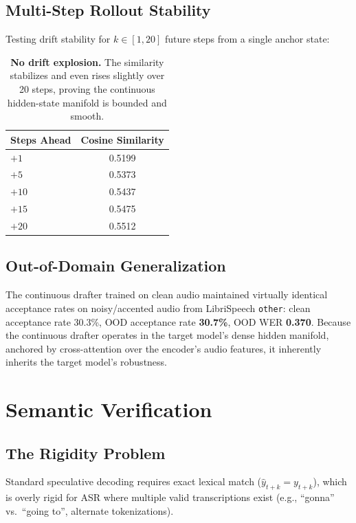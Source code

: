 \documentclass[11pt,a4paper]{article}
\begin{document}
\subsection{Multi-Step Rollout Stability}

Testing drift stability for $k \in [1, 20]$ future steps from a single anchor state:

\begin{table}[H]
\centering
\small
\begin{tabular}{@{}lc@{}}
\toprule
\textbf{Steps Ahead} & \textbf{Cosine Similarity} \\
\midrule
$+1$  & 0.5199 \\
$+5$  & 0.5373 \\
$+10$ & 0.5437 \\
$+15$ & 0.5475 \\
$+20$ & 0.5512 \\
\bottomrule
\end{tabular}
\caption{\textbf{No drift explosion.}
The similarity stabilizes and even rises slightly over 20 steps, proving the continuous hidden-state manifold is bounded and smooth.}
\label{tab:rollout}
\end{table}

\subsection{Out-of-Domain Generalization}

The continuous drafter trained on clean audio maintained virtually identical acceptance rates on noisy/accented audio from LibriSpeech \texttt{other}:
clean acceptance rate 30.3\%, OOD acceptance rate \textbf{30.7\%}, OOD WER \textbf{0.370}.
Because the continuous drafter operates in the target model's dense hidden manifold, anchored by cross-attention over the encoder's audio features, it inherently inherits the target model's robustness.


\section{Semantic Verification}

\subsection{The Rigidity Problem}
Standard speculative decoding requires exact lexical match ($\hat{y}_{t+k} = y_{t+k}$), which is overly rigid for ASR where multiple valid transcriptions exist (e.g., ``gonna'' vs.\ ``going to'', alternate tokenizations).
\end{document}

